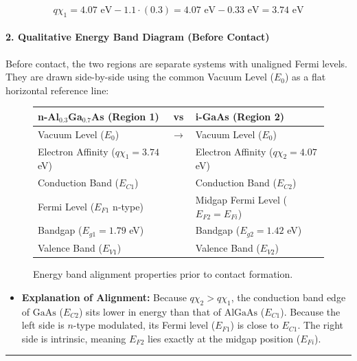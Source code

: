 \documentclass[
]{article}
\providecommand{\tightlist}{%
  \setlength{\itemsep}{0pt}\setlength{\parskip}{0pt}}
\begin{document}
\[q\chi_1 = 4.07\text{ eV} - 1.1 \cdot (0.3) = 4.07\text{ eV} - 0.33\text{ eV} = 3.74\text{ eV}\]

\paragraph{2. Qualitative Energy Band Diagram (Before
Contact)}\label{qualitative-energy-band-diagram-before-contact}

Before contact, the two regions are separate systems with unaligned
Fermi levels. They are drawn side-by-side using the common Vacuum Level
(\(E_0\)) as a flat horizontal reference line:

\begin{figure}[h]
\centering
\renewcommand{\arraystretch}{1.3}
\begin{tabular}{|l|c|l|}
\hline
\textbf{n-Al$_{0.3}$Ga$_{0.7}$As (Region 1)} & \textbf{vs} & \textbf{i-GaAs (Region 2)} \\
\hline
Vacuum Level ($E_0$) & $\rightarrow$ & Vacuum Level ($E_0$) \\
Electron Affinity ($q\chi_1 = 3.74$ eV) & & Electron Affinity ($q\chi_2 = 4.07$ eV) \\
Conduction Band ($E_{C1}$) & & Conduction Band ($E_{C2}$) \\
Fermi Level ($E_{F1}$ n-type) & & Midgap Fermi Level ($E_{F2} = E_{Fi}$) \\
Bandgap ($E_{g1} = 1.79$ eV) & & Bandgap ($E_{g2} = 1.42$ eV) \\
Valence Band ($E_{V1}$) & & Valence Band ($E_{V2}$) \\
\hline
\end{tabular}
\caption{Energy band alignment properties prior to contact formation.}
\end{figure}

\begin{itemize}
\tightlist
\item
  \textbf{Explanation of Alignment:} Because \(q\chi_2 > q\chi_1\), the
  conduction band edge of \(\text{GaAs}\) (\(E_{C2}\)) sits lower in
  energy than that of \(\text{AlGaAs}\) (\(E_{C1}\)). Because the left
  side is \(n\)-type modulated, its Fermi level (\(E_{F1}\)) is close to
  \(E_{C1}\). The right side is intrinsic, meaning \(E_{F2}\) lies
  exactly at the midgap position (\(E_{Fi}\)).
\end{itemize}

\begin{center}\rule{0.5\linewidth}{0.5pt}\end{center}
\end{document}

